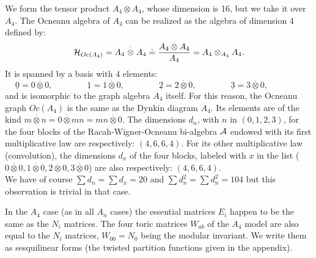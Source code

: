 \documentclass[a4paper,11pt]{article}
\def \otimesdot {\stackrel{\cdot}{\otimes}}
\newcommand{\ud}[1]{\underline{#1}}
\begin{document}
\normalsize

We form the tensor product $A_4 \otimes A_4$, whose dimension is 16, but
we take it over $A_4$. The Ocneanu algebra
of $A_4$  can be realized as the algebra of dimension 4 defined by:
$$
{\cal H}_{Oc(A_4)} = A_4 \otimesdot A_4 \doteq
\frac{A_4 \otimes A_4 }{A_4} = A_4 \otimes_{A_4} A_4.
$$
It is spanned by a basis with 4 elements:
$$
\ud0 = 0 \otimesdot 0, \qquad \qquad  \ud1 = 1 \otimesdot 0, \qquad \qquad
\ud2 = 2 \otimesdot 0, \qquad \qquad  \ud3 = 3 \otimesdot 0, \qquad \qquad
$$
and is isomorphic to the graph algebra $A_4$ itself.
For this reason, the Ocneanu graph $Oc(A_4)$ is the same as
the Dynkin diagram $A_4$.
Its elements are of the kind $m \otimesdot n = 0 \otimesdot mn = mn
\otimesdot 0$.
The dimensions $d_{n}$, with $n$ in $(0,1,2,3)$,
for the four blocks of the Racah-Wigner-Ocneanu bi-algebra $\cal A$
endowed with its first multiplicative law are respectively:
$(4,6,6,4).$
For its other multiplicative law (convolution), the dimensions $d_x$
of the four blocks, labeled with $x$ in the list ($0 \otimesdot 0, 1
\otimesdot 0, 2 \otimesdot 0, 3 \otimesdot 0$) are also respectively:
$(4,6,6,4)$.\\
We have of course $\sum d_{n} = \sum d_{x} = 20$ and $\sum d_{n}^2 = \sum
d_{n}^2 = 104$ but this observation is trivial in that case.

In the $A_4$ case (as in all $A_{n}$ cases) the essential matrices
$E_i$ happen to be the same as
the $N_i$ matrices.
The four toric matrices $W_{ab}$ of the $A_4$ model are also equal
to the $N_i$ matrices, $W_{00} = N_0$ being the  modular invariant.
We write them as sesquilinear forms (the twisted partition functions
given in the appendix).
\end{document}
